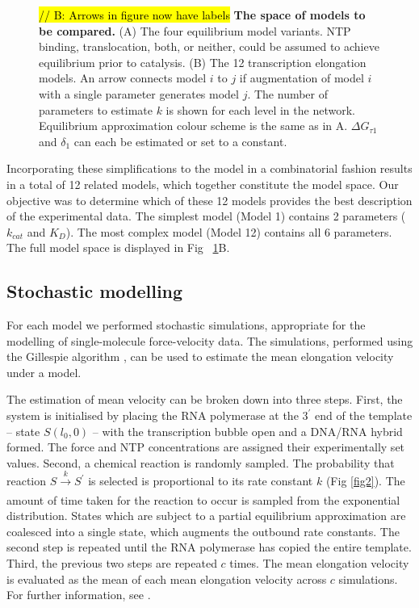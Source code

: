 \documentclass[10pt,letterpaper]{article}
\begin{document}
\begin{figure}[!h]
\caption{\textcolor{red}{\hl{// B: Arrows in figure now have labels }} \textbf{ The space of models to be compared.} (A) The four equilibrium model variants. NTP binding, translocation, both, or neither, could be assumed to achieve equilibrium prior to catalysis. (B) The 12 transcription elongation models. An arrow connects model $i$ to $j$ if augmentation of model $i$ with a single parameter generates model $j$. The number of parameters to estimate  $k$ is shown for each level in the network. Equilibrium approximation colour scheme is the same as in A. $\Delta G_{\tau 1}$ and $\delta_1$ can each be estimated or set to a constant.}
\label{fig4}
\end{figure}



Incorporating these simplifications to the model in a combinatorial fashion results in a total of 12 related models, which together constitute the model space. Our objective was to determine which of these 12 models provides the best description of the experimental data. The simplest model (Model 1) contains 2 parameters ($k_{cat}$ and $K_D$). The most complex model (Model 12) contains all 6 parameters. The full model space is displayed in Fig ~\ref{fig4}B.






\subsection*{Stochastic modelling}


For each model we performed stochastic simulations, appropriate for the modelling of single-molecule force-velocity data. The simulations, performed using the Gillespie algorithm \cite{gillespie1977exact, lecca2013stochastic}, can be used to estimate the mean elongation velocity under a model.



The estimation of mean velocity can be broken down into three steps. First, the system is initialised by placing the RNA polymerase at the $3^\prime$ end of the template -- state $S(l_0, 0)$ -- with the transcription bubble open and a DNA/RNA hybrid formed. The force and NTP concentrations are assigned their experimentally set values. Second, a chemical reaction is randomly sampled. The probability that reaction $S \xrightarrow[]{k} S^\prime$ is selected is proportional to its rate constant $k$ (Fig \ref{fig2}).  The amount of time taken for the reaction to occur is sampled from the exponential distribution. States which are subject to a partial equilibrium approximation are coalesced into a single state, which augments the outbound rate constants. The second step is repeated until the RNA polymerase has copied the entire template. Third, the previous two steps are repeated $c$ times. The mean elongation velocity is evaluated as the mean of each mean elongation velocity across $c$ simulations. For further information, see .\\
\end{document}
